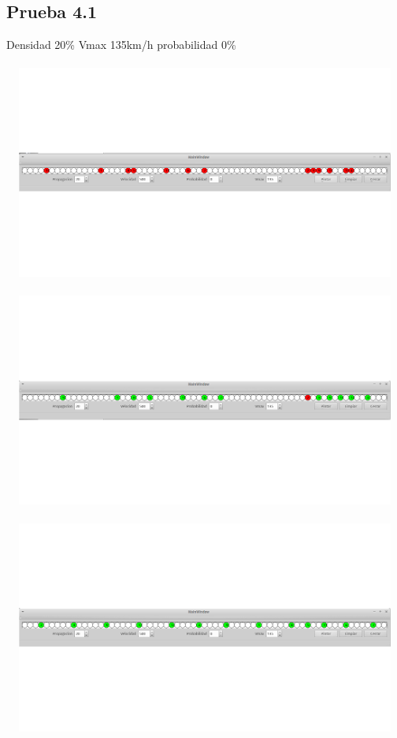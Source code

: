 \documentclass[a4paper,10pt]{article}
\begin{document}
\subsection{Prueba 4.1}
Densidad 20\% Vmax 135km/h probabilidad 0\%
\\ \\
\includegraphics[width=15cm, height=7cm]{15}
\\ \\
\includegraphics[width=15cm, height=7cm]{16}
\\ \\
\includegraphics[width=15cm, height=7cm]{17}
\end{document}

